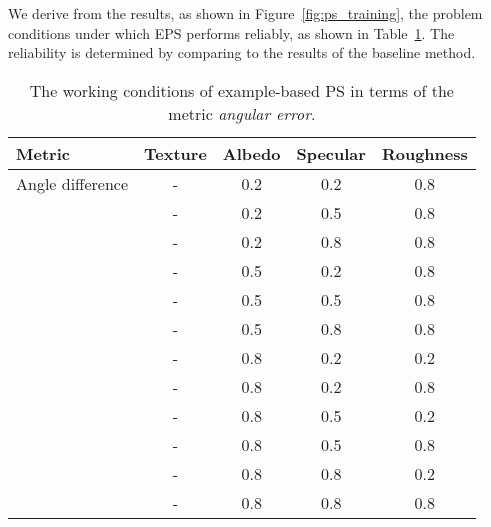 
We derive from the results, as shown in Figure~\ref{fig:ps_training}, the problem conditions under which EPS performs reliably, as shown in Table~\ref{tab:ps_training_result}. The reliability is determined by comparing to the results of the baseline method.
\begin{table}[!htbp]
  \centering
  \begin{tabular}{l*{4}{c}}
  \hline
  \textbf{Metric} & Texture & Albedo & Specular & Roughness\\
  \hline
  Angle difference & - & 0.2 & 0.2 & 0.8\\
                   & - & 0.2 & 0.5 & 0.8\\
                   & - & 0.2 & 0.8 & 0.8\\
                   & - & 0.5 & 0.2 & 0.8\\
                   & - & 0.5 & 0.5 & 0.8\\
                   & - & 0.5 & 0.8 & 0.8\\
                   & - & 0.8 & 0.2 & 0.2\\ %
                   & - & 0.8 & 0.2 & 0.8\\
                   & - & 0.8 & 0.5 & 0.2\\
                   & - & 0.8 & 0.5 & 0.8\\
                   & - & 0.8 & 0.8 & 0.2\\ %
                   & - & 0.8 & 0.8 & 0.8\\
  \hline
  \end{tabular}
  \caption{The working conditions of example-based PS in terms of the metric \textit{angular error}.}
  \label{tab:ps_training_result}
\end{table}

